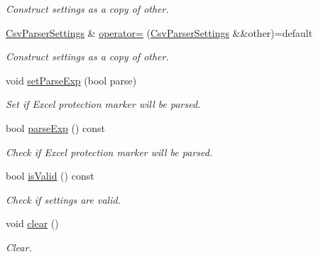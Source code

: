\begin{DoxyCompactItemize}
\begin{DoxyCompactList}\small\item\em Construct settings as a copy of {\itshape other}. \end{DoxyCompactList}\item 
\hyperlink{class_mdt_1_1_plain_text_1_1_csv_parser_settings}{Csv\+Parser\+Settings} \& \hyperlink{class_mdt_1_1_plain_text_1_1_csv_parser_settings_a1d46a0ea41d380b8db95cb9d95c2190b}{operator=} (\hyperlink{class_mdt_1_1_plain_text_1_1_csv_parser_settings}{Csv\+Parser\+Settings} \&\&other)=default\hypertarget{class_mdt_1_1_plain_text_1_1_csv_parser_settings_a1d46a0ea41d380b8db95cb9d95c2190b}{}\label{class_mdt_1_1_plain_text_1_1_csv_parser_settings_a1d46a0ea41d380b8db95cb9d95c2190b}

\begin{DoxyCompactList}\small\item\em Construct settings as a copy of {\itshape other}. \end{DoxyCompactList}\item 
void \hyperlink{class_mdt_1_1_plain_text_1_1_csv_parser_settings_abe60d57922026d9de7a6e8d55511819e}{set\+Parse\+Exp} (bool parse)
\begin{DoxyCompactList}\small\item\em Set if Excel protection marker will be parsed. \end{DoxyCompactList}\item 
bool \hyperlink{class_mdt_1_1_plain_text_1_1_csv_parser_settings_af40bd9b66e5bec47230ece1cba3ee16a}{parse\+Exp} () const 
\begin{DoxyCompactList}\small\item\em Check if Excel protection marker will be parsed. \end{DoxyCompactList}\item 
bool \hyperlink{class_mdt_1_1_plain_text_1_1_csv_parser_settings_adf3ffeee7f6a9b5ba12108ee859ad0ce}{is\+Valid} () const 
\begin{DoxyCompactList}\small\item\em Check if settings are valid. \end{DoxyCompactList}\item 
void \hyperlink{class_mdt_1_1_plain_text_1_1_csv_parser_settings_a608d99bfe1f6777a8ff2b797d3b16931}{clear} ()
\begin{DoxyCompactList}\small\item\em Clear. \end{DoxyCompactList}\end{DoxyCompactItemize}


